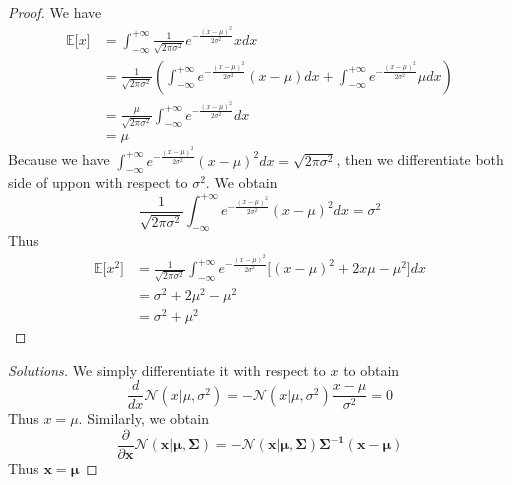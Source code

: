 \documentclass[12pt]{article}
\newcommand{\E}{\mathbb{E}}
\newenvironment{exercise}[2][Ex]{\begin{trivlist}
\item[\hskip \labelsep {\bfseries #1}\hskip \labelsep {\bfseries #2.}]}{\end{trivlist}}
\begin{document}
\begin{exercise}{1.8(**)}
    \begin{proof}
        We have
        \begin{align}
            \E\lbrack x\rbrack&=\int_{-\infty}^{+\infty}\frac{1}{\sqrt{2\pi\sigma^2}}
            e^{-\frac{(x-\mu)^2}{2\sigma^2}}xdx\nonumber\\
            &=\frac{1}{\sqrt{2\pi\sigma^2}}(\int_{-\infty}^{+\infty}e^{-\frac{(x-\mu)^2}
            {2\sigma^2}}(x-\mu)dx+\int_{-\infty}^{+\infty}e^{-\frac{(x-\mu)^2}{2\sigma^2}}
            \mu dx)\nonumber\\
            &=\frac{\mu}{\sqrt{2\pi\sigma^2}}\int_{-\infty}^{+\infty}e^{-\frac{(x-\mu)^2}
            {2\sigma^2}}dx\nonumber\\
            &=\mu
        \end{align}
        Because we have $\int_{-\infty}^{+\infty}e^{-\frac{(x-\mu)^2}{2\sigma^2}}(x-\mu)^2
        dx=\sqrt{2\pi\sigma^2}$, then we differentiate both side of uppon with respect to 
        $\sigma^2$. We obtain
        \begin{equation}
            \frac{1}{\sqrt{2\pi\sigma^2}}\int_{-\infty}^{+\infty}e^{-\frac{(x-\mu)^2}
            {2\sigma^2}}(x-\mu)^2dx=\sigma^2
        \end{equation}
        Thus
        \begin{align*}
            \E\lbrack x^2\rbrack&=
            \frac{1}{\sqrt{2\pi\sigma^2}}\int_{-\infty}^{+\infty}e^{-\frac{(x-\mu)^2}
            {2\sigma^2}}\lbrack(x-\mu)^2+2x\mu-\mu^2\rbrack dx\\
            &=\sigma^2+2\mu^2-\mu^2\\
            &=\sigma^2+\mu^2
        \end{align*}
    \end{proof}
\end{exercise}
\begin{exercise}{1.9(*)}
    \begin{proof}[Solutions]
        We simply differentiate it with respect to $x$ to obtain
        \begin{equation}
            \frac{d}{dx}\mathcal{N}(x|\mu,\sigma^2)=-\mathcal{N}(x|\mu,\sigma^2)\frac{x-\mu}
            {\sigma^2}=0
        \end{equation}
        Thus $x=\mu$. 
        Similarly, we obtain
        \begin{equation}
            \frac{\partial}{\partial\bm{x}}\mathcal{N}(\bm{x}|\bm{\mu},\bm{\Sigma})=
            -\mathcal{N}(\bm{x}|\bm{\mu},\bm{\Sigma})\bm{\Sigma^{-1}}(\bm{x}-\bm{\mu})
        \end{equation}
        Thus $\bm{x}=\bm{\mu}$
    \end{proof}
\end{exercise}
\end{document}
